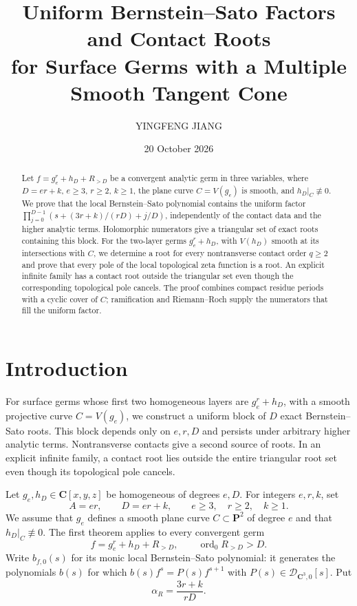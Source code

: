 \documentclass[11pt]{article}
\title{Uniform Bernstein--Sato Factors and Contact Roots\\
for Surface Germs with a Multiple Smooth Tangent Cone}
\author{YINGFENG JIANG}
\date{20 October 2026}
\numberwithin{equation}{section}
\theoremstyle{definition}
\theoremstyle{remark}
\newcommand{\CC}{\mathbf C}
\newcommand{\PP}{\mathbf P}
\newcommand{\bfzero}{b_{f,0}}
\DeclareMathOperator{\ord}{ord}
\begin{document}
\maketitle

\begin{abstract}
Let $f=g_e^r+h_D+R_{>D}$ be a convergent analytic germ in three
variables, where $D=er+k$, $e\ge3$, $r\ge2$, $k\ge1$, the plane
curve $C=V(g_e)$ is smooth, and $h_D|_C\not\equiv0$.
We prove that the local Bernstein--Sato polynomial contains the
uniform factor
$\prod_{j=0}^{D-1}(s+(3r+k)/(rD)+j/D)$, independently of the
contact data and the higher analytic terms. Holomorphic numerators
give a triangular set of exact roots containing this block.
For the two-layer
germs $g_e^r+h_D$, with $V(h_D)$ smooth at its intersections with
$C$, we determine a root for every nontransverse contact order
$q\ge2$ and prove that every pole of the local topological zeta
function is a root. An explicit infinite family has a contact root
outside the triangular set even though the corresponding topological pole
cancels. The proof combines compact residue periods with a cyclic
cover of $C$; ramification and Riemann--Roch supply the numerators
that fill the uniform factor.
\end{abstract}

\section{Introduction}\label{sec:introduction}

For surface germs whose first two homogeneous layers are
$g_e^r+h_D$, with a smooth projective curve $C=V(g_e)$,
we construct a uniform block of $D$ exact Bernstein--Sato
roots. This block depends only on $e,r,D$ and persists
under arbitrary higher analytic terms. Nontransverse
contacts give a second source of roots. In an explicit
infinite family, a contact root lies outside the entire
triangular root set even though its topological pole cancels.

Let $g_e,h_D\in\CC[x,y,z]$ be homogeneous of degrees $e,D$.
For integers $e,r,k$, set
\begin{equation}\label{eq:degrees}
 A=er,\qquad D=er+k,\qquad e\ge3,\quad r\ge2,\quad k\ge1.
\end{equation}
We assume that $g_e$ defines a smooth plane curve $C\subset\PP^2$
of degree $e$ and that $h_D|_C\not\equiv0$. The first theorem
applies to every convergent germ
\begin{equation}\label{eq:analytic-family}
 f=g_e^r+h_D+R_{>D},\qquad \ord_0R_{>D}>D.
\end{equation}
Write $\bfzero(s)$ for its monic local Bernstein--Sato polynomial:
it generates the polynomials $b(s)$ for which
$b(s)f^s=P(s)f^{s+1}$ with $P(s)\in\mathcal D_{\CC^3,0}[s]$.
Put
\begin{equation}\label{eq:alpha-R}
 \alpha_R=\frac{3r+k}{rD}.
\end{equation}
\end{document}
